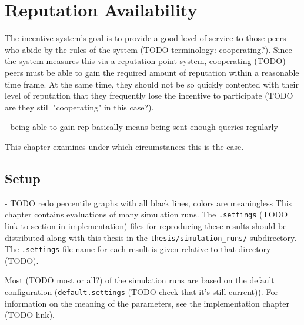 \chapter{Reputation Availability}
\label{chap:rep_avail}
The incentive system's goal is to provide a good level of service to those peers
who abide by the rules of the system (TODO terminology: cooperating?). Since the
system measures this via a reputation point system, cooperating (TODO) peers
must be able to gain the required amount of reputation within a reasonable time
frame. At the same time, they should not be so quickly contented with their
level of reputation that they frequently lose the incentive to participate (TODO
are they still "cooperating" in this case?).

- being able to gain rep basically means being sent enough queries regularly

This chapter examines under which circumstances this is the case.

\section{Setup}
- TODO redo percentile graphs with all black lines, colors are meaningless
This chapter contains evaluations of many simulation runs. The
\texttt{.settings} (TODO link to section in implementation) files for
reproducing these results should be distributed along with this thesis in the
\texttt{thesis/simulation\_runs/} subdirectory. The \texttt{.settings} file name
for each result is given relative to that directory (TODO).

Most (TODO most or all?) of the simulation runs are based on the default
configuration (\texttt{default.settings} (TODO check that it's still current)).
For information on the meaning of the parameters, see the implementation chapter
(TODO link).

